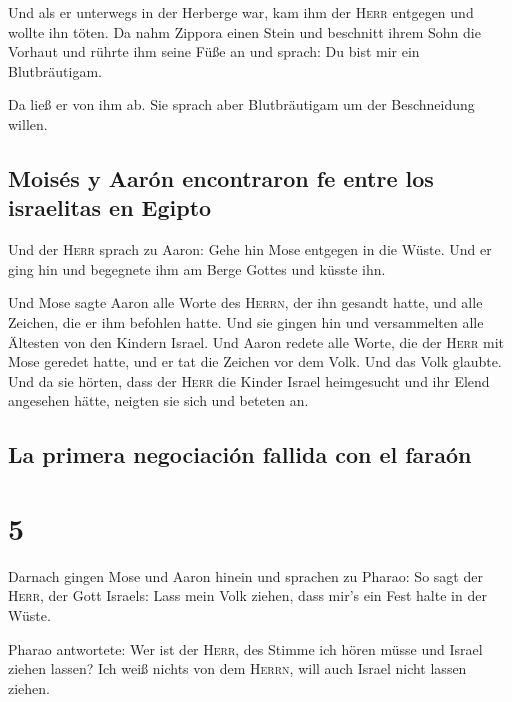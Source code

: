  Und als er unterwegs in der Herberge war, kam ihm der
\textsc{Herr} entgegen und wollte ihn töten.  Da nahm
Zippora einen Stein und beschnitt ihrem Sohn die Vorhaut und rührte ihm
seine Füße an und sprach: Du bist mir ein Blutbräutigam.

 Da ließ er von ihm ab. Sie sprach aber Blutbräutigam um
der Beschneidung willen.

\hypertarget{moisuxe9s-y-aaruxf3n-encontraron-fe-entre-los-israelitas-en-egipto}{%
\subsection{Moisés y Aarón encontraron fe entre los israelitas en
Egipto}\label{moisuxe9s-y-aaruxf3n-encontraron-fe-entre-los-israelitas-en-egipto}}

 Und der \textsc{Herr} sprach zu Aaron: Gehe hin Mose
entgegen in die Wüste. Und er ging hin und begegnete ihm am Berge Gottes
und küsste ihn.

 Und Mose sagte Aaron alle Worte des \textsc{Herrn}, der
ihn gesandt hatte, und alle Zeichen, die er ihm befohlen hatte.
 Und sie gingen hin und versammelten alle Ältesten von
den Kindern Israel.  Und Aaron redete alle Worte, die der
\textsc{Herr} mit Mose geredet hatte, und er tat die Zeichen vor dem
Volk.  Und das Volk glaubte. Und da sie hörten, dass der
\textsc{Herr} die Kinder Israel heimgesucht und ihr Elend angesehen
hätte, neigten sie sich und beteten an.

\hypertarget{la-primera-negociaciuxf3n-fallida-con-el-farauxf3n}{%
\subsection{La primera negociación fallida con el
faraón}\label{la-primera-negociaciuxf3n-fallida-con-el-farauxf3n}}

\hypertarget{section-4}{%
\section{5}\label{section-4}}

 Darnach gingen Mose und Aaron hinein und sprachen zu
Pharao: So sagt der \textsc{Herr}, der Gott Israels: Lass mein Volk
ziehen, dass mir's ein Fest halte in der Wüste.

 Pharao antwortete: Wer ist der \textsc{Herr}, des Stimme
ich hören müsse und Israel ziehen lassen? Ich weiß nichts von dem
\textsc{Herrn}, will auch Israel nicht lassen ziehen.

